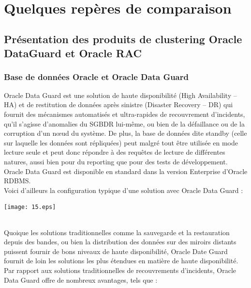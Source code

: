 \documentclass[12pt]{report}
\begin{document}
\chapter{Quelques repères de comparaison}

\section{Présentation des produits de clustering Oracle DataGuard et Oracle RAC}

\subsection{Base de données Oracle et Oracle Data Guard}

Oracle Data Guard est une solution de haute disponibilité (High Availability –
HA) et de restitution de données après sinistre (Disaster Recovery – DR) qui
fournit des mécanismes automatisés et ultra-rapides de recouvrement d'incidents,
qu'il s'agisse d'anomalies du SGBDR lui-même, ou bien de la défaillance ou de la
corruption d'un nœud du système. De plus, la base de données dite standby (celle
sur laquelle les données sont répliquées) peut malgré tout être utilisée en mode
lecture seule et peut donc répondre à des requêtes de lecture de différentes
natures, aussi bien pour du reporting que pour des tests de
développement. Oracle Data Guard est disponible en standard dans la version
Enterprise d'Oracle RDBMS. \\

Voici d'ailleurs la configuration typique d'une solution avec Oracle Data
Guard : \\

\begin{center}
  \texttt{[image: 15.eps]}
\end{center}\\

Quoique les solutions traditionnelles comme la sauvegarde et la restauration
depuis des bandes, ou bien la distribution des données sur des miroirs distants
puissent fournir de bons niveaux de haute disponibilité, Oracle Date Guard
fournit de loin les solutions les plus étendues en matière de haute
disponibilité. \\


Par rapport aux solutions traditionnelles de recouvrements d'incidents, Oracle
Data Guard offre de nombreux avantages, tels que : \\
\end{document}
